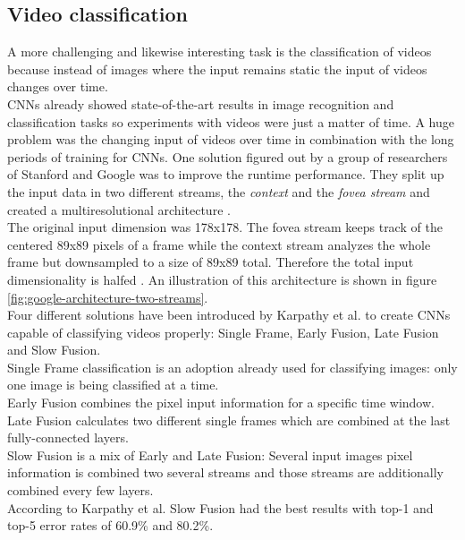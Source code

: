 \documentclass[12pt,twoside]{article}
\theoremstyle{plain}
\theoremstyle{definition}
\theoremstyle{remark}
\begin{document}
\subsection{Video classification}

A more challenging and likewise interesting task is the classification of videos because instead of images where the input remains static the input of videos changes over time.
\\
CNNs already showed state-of-the-art results in image recognition and classification tasks so experiments with videos were just a matter of time. A huge problem was the changing input of videos over time in combination with the long periods of training for CNNs. One solution figured out by a group of researchers of Stanford and Google was to improve the runtime performance. They split up the input data in two different streams, the \textit{context} and the \textit{fovea stream} and created a multiresolutional architecture \cite{GoogleLargeScaleVideoClassification-Karpathy}.
\\
The original input dimension was 178x178. The fovea stream keeps track of the centered 89x89 pixels of a frame while the context stream analyzes the whole frame but downsampled to a size of 89x89 total. Therefore the total input dimensionality is halfed \cite{GoogleLargeScaleVideoClassification-Karpathy}. An illustration of this architecture is shown in figure \ref{fig:google-architecture-two-streams}.
\\
Four different solutions have been introduced by Karpathy et al. to create CNNs capable of classifying videos properly: Single Frame, Early Fusion, Late Fusion and Slow Fusion.
\\
Single Frame classification is an adoption already used for classifying images: only one image is being classified at a time.
\\
Early Fusion combines the pixel input information for a specific time window.
\\
Late Fusion calculates two different single frames which are combined at the last fully-connected layers.
\\
Slow Fusion is a mix of Early and Late Fusion: Several input images pixel information is combined two several streams and those streams are additionally combined every few layers.
\\
According to Karpathy et al. \cite{GoogleLargeScaleVideoClassification-Karpathy} Slow Fusion had the best results with top-1 and top-5 error rates of 60.9\% and 80.2\%.
\end{document}
